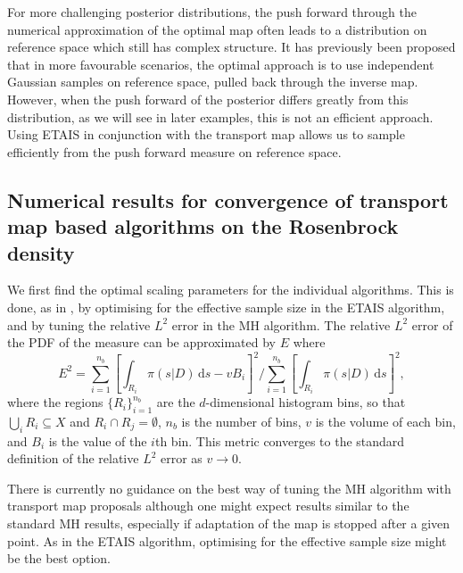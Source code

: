 \documentclass[final]{siamltex}
\newcommand{\edit}[1]{{\color{red} #1}}
\begin{document}
\edit{For more challenging posterior distributions, the push forward
  through the numerical
approximation of the optimal map often leads to a distribution on
reference space which still has complex structure. It has previously
been proposed that in more favourable scenarios, the optimal approach
is to use independent Gaussian samples on reference space, pulled back
through the inverse map. However, when the push forward of the
posterior differs greatly from this distribution, as we will see in
later examples, this is not an
efficient approach. Using ETAIS in conjunction with the transport map
allows us to sample efficiently from the push forward measure on
reference space.}

\subsection[Numerical results]{Numerical results for convergence of
  transport map based algorithms on the Rosenbrock density}

We first find the optimal scaling parameters for the individual
algorithms. This is done, as in \cite{cotter2015parallel}, by optimising for the effective sample size in
the ETAIS algorithm, and by tuning the relative $L^2$ error in the MH
algorithm. 
\edit{The relative $L^2$ error of the PDF of the measure can be
  approximated by $E$ where
\begin{equation}\label{eqn:L2_error}
	E^2 = \sum\limits_{i=1}^{n_b}\left[\displaystyle\int_{R_i} \! \pi(s|D) \, \mbox{d}s - vB_i\right]^2 \Big/ \sum\limits_{i=1}^{n_b}\left[\displaystyle\int_{R_i} \! \pi(s|D) \, \mbox{d}s\right]^2,
\end{equation}
where the regions $\{R_i\}_{i=1}^{n_b}$ are the $d$-dimensional
histogram bins, so that $\bigcup_i R_i \subseteq X$ and
$R_i\cap R_j=\emptyset$, $n_b$ is the number of bins, $v$ is the
volume of each bin, and $B_i$ is the value of the $i$th bin. This
metric converges to the standard definition of the relative $L^2$
error as $v\rightarrow 0$.}

There is currently no
guidance on the best way of tuning the MH algorithm with transport map
proposals although one might expect results similar to the standard MH
results, especially if adaptation of the map is stopped after a given
point. As in the ETAIS algorithm, optimising for the effective sample size might be the best option.
\end{document}
